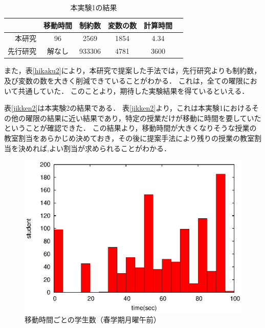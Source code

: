 \documentclass[a4paper,10pt]{jarticle}
\begin{document}
\begin{table}[h]
\caption{本実験1の結果}
\label{hikaku1}
\begin{center}
\begin{tabular}{|r|ccccc|}
\hline
&移動時間&制約数&変数の数&計算時間\\
\hline
本研究 & 96  & 2569 & 1854 &  4.34\\  
先行研究 & 解なし & 933306 & 4781 &  3600\\ 
\hline
\end{tabular}
\end{center}
\end{table}
\fi

また，表\ref{hikaku2}により，本研究で提案した手法では，先行研究よりも制約数，及び変数の数を大きく削減できていることがわかる．
これは，全ての曜限において共通していた．
このことより，期待した実験結果を得ているといえる．

表\ref{jikken2}は本実験2の結果である．
表\ref{jikken2}より，これは本実験1におけるその他の曜限の結果に近い結果であり，特定の授業だけが移動に時間を要していたということが確認できた．
この結果より，移動時間が大きくなりそうな授業の教室割当をあらかじめ決めておき，その後に提案手法により残りの授業の教室割当を決めれば,よい割当が求められることがわかる．
\begin{figure}[thpb]
 \begin{center}
 \hspace{5mm} 
\includegraphics[bb=0 0 390 248,clip,scale=0.6]{oMo12_hist.eps}
 \hspace{-10mm} 
\vspace{-5mm}
  \caption{移動時間ごとの学生数（春学期月曜午前）}
  \label{omo12}
 \end{center}
\end{figure}
\vspace{-5mm}
\end{document}
